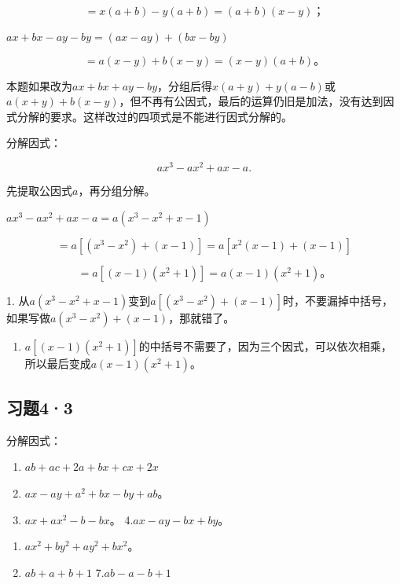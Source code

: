 \[
= x (a + b) - y (a + b) = (a + b) (x - y)\text{；}
\]

\(ax + bx - ay - by = (ax - ay) + (bx - by)\)

\[
= a (x - y) + b (x - y) = (x - y) (a + b)\text{。}
\]

本题如果改为\(ax + bx + ay - by\)，分组后得\(x(a + y) + y(a - b)\)或\(a(x + y) + b(x - y)\)，但不再有公因式，最后的运算仍旧是加法，没有达到因式分解的要求。这样改过的四项式是不能进行因式分解的。

 分解因式：

\[
a x ^{3} - a x ^{2} + a x - a.
\]

 先提取公因式\(a\)，再分组分解。

\(ax^3 - ax^2 + ax - a = a(x^3 - x^2 + x - 1)\)

\[
= a \left[ \left(x ^{3} - x ^{2}\right) + (x - 1) \right] = a \left[ x ^{2} (x - 1) + (x - 1) \right]
\]

\[
= a [ (x - 1) (x ^{2} + 1) ] = a (x - 1) (x ^{2} + 1)\text{。}
\]

 1.
从\(a(x^3 - x^2 + x - 1)\)变到\(a[(x^3 - x^2) + (x - 1)]\)时，不要漏掉中括号，如果写做\(a(x^3 - x^2) + (x - 1)\)，那就错了。

\begin{enumerate}[start=2]
\item
  \(a[(x - 1)(x^2 + 1)]\)的中括号不需要了，因为三个因式，可以依次相乘，所以最后变成\(a(x - 1)(x^2 + 1)\)。
\end{enumerate}

\subsection{习题4·3}

分解因式：

\begin{enumerate}[start=1]
\item
  \(ab + ac + 2a + bx + cx + 2x\)
\item
  \(ax - ay + a^2 + bx - by + ab\)。
\item
  \(ax + ax^2 - b - bx\)。 4.\(ax - ay - bx + by\)。
\end{enumerate}

\begin{enumerate}[start=5]
\item
  \(ax^2 + by^2 + ay^2 + bx^2\)。
\item
  \(ab + a + b + 1\) 7.\(ab - a - b + 1\)
\end{enumerate}


